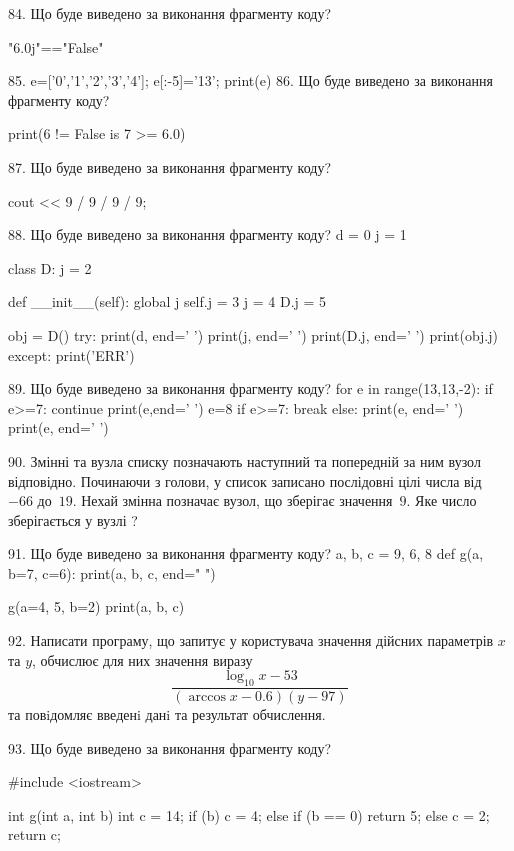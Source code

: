 \documentclass[11pt]{article}
\begin{document}
84. Що буде виведено за виконання фрагменту коду?

"6.0j"=="False"

85. 
e=['0','1','2','3','4']; e[:-5]='13'; print(e)
86. Що буде виведено за виконання фрагменту коду?

print(6 != False is 7 >= 6.0)

87. Що буде виведено за виконання фрагменту коду?

cout << 9 / 9 / 9 / 9;

88. Що буде виведено за виконання фрагменту коду?
d = 0
j = 1

class D:
    j = 2
    
    def __init__(self):
global j        self.j = 3
        j = 4
        D.j = 5

obj = D()
try:
    print(d, end=' ')
    print(j, end=' ')
    print(D.j, end=' ')
    print(obj.j)
except:
    print('ERR')

89. Що буде виведено за виконання фрагменту коду?
for e in range(13,13,-2):
    if e>=7:
        continue
        print(e,end=' ')
        e=8
    if e>=7:
        break
else:
    print(e, end=' ')
print(e, end=' ')

90. 
Змінні  та  вузла списку позначають наступний та попередній за ним вузол відповідно. Починаючи з голови, у список записано послідовні цілі числа від~$-66$ до~$19$. Нехай змінна  позначає вузол, що зберігає значення~$9$.
Яке число зберігається у вузлі  ?

91. Що буде виведено за виконання фрагменту коду?
a, b, c = 9, 6, 8
def g(a, b=7, c=6):
    print(a, b, c, end=" ")

g(a=4, 5, b=2)
print(a, b, c)

92. 
Написати програму, що запитує у користувача значення дійсних параметрів $x$ та $y$, обчислює для них значення виразу 
$$\frac{\log_{10} x - 53}{(\arccos x - 0.6) (y - 97)}$$ 
та повiдомляє введенi данi та результат обчислення.


93. Що буде виведено за виконання фрагменту коду?

#include <iostream>

int g(int a, int b){
    int c = 14;
    if (b)
        c = 4;
    else if (b == 0)
         return 5;
    else 
        c = 2;
    return c;
}
\end{document}
